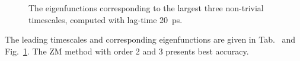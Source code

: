 \documentclass[aip,jcp,a4paper,reprint,unsortedaddress,onecolumn,fleqn]{revtex4-1}
\begin{document}
\begin{figure}
  \caption{The eigenfunctions corresponding to the largest three
    non-trivial timescales, computed with lag-time 20~ps.}
  \label{fig:tmp5}
\end{figure}

The leading timescales and corresponding eigenfunctions are given in
Tab.~\label{tab:tmp3} and Fig.~\ref{fig:tmp5}. The ZM method with
order 2 and 3 presents best accuracy.



\newpage
{}

\end{document}
